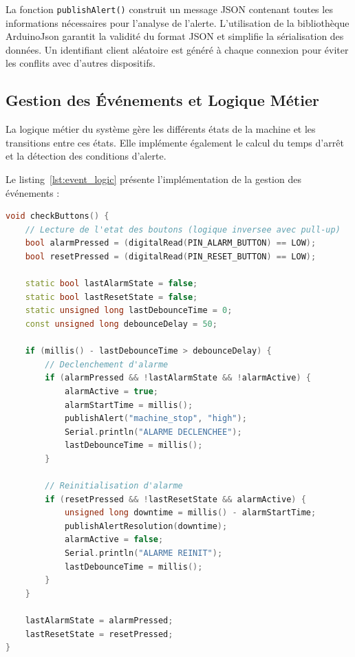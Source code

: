 La fonction \texttt{publishAlert()} construit un message JSON contenant toutes les informations nécessaires pour l'analyse de l'alerte. L'utilisation de la bibliothèque ArduinoJson garantit la validité du format JSON et simplifie la sérialisation des données. Un identifiant client aléatoire est généré à chaque connexion pour éviter les conflits avec d'autres dispositifs.

\subsection{Gestion des Événements et Logique Métier}
\label{subsec:impl_events}

La logique métier du système gère les différents états de la machine et les transitions entre ces états. Elle implémente également le calcul du temps d'arrêt et la détection des conditions d'alerte.

Le listing~\ref{lst:event_logic} présente l'implémentation de la gestion des événements :

\begin{lstlisting}[language=C++, caption={Logique de gestion des événements et états machine}, label={lst:event_logic}, captionpos=b]
void checkButtons() {
    // Lecture de l'etat des boutons (logique inversee avec pull-up)
    bool alarmPressed = (digitalRead(PIN_ALARM_BUTTON) == LOW);
    bool resetPressed = (digitalRead(PIN_RESET_BUTTON) == LOW);
    
    static bool lastAlarmState = false;
    static bool lastResetState = false;
    static unsigned long lastDebounceTime = 0;
    const unsigned long debounceDelay = 50;
    
    if (millis() - lastDebounceTime > debounceDelay) {
        // Declenchement d'alarme
        if (alarmPressed && !lastAlarmState && !alarmActive) {
            alarmActive = true;
            alarmStartTime = millis();
            publishAlert("machine_stop", "high");
            Serial.println("ALARME DECLENCHEE");
            lastDebounceTime = millis();
        }
        
        // Reinitialisation d'alarme
        if (resetPressed && !lastResetState && alarmActive) {
            unsigned long downtime = millis() - alarmStartTime;
            publishAlertResolution(downtime);
            alarmActive = false;
            Serial.println("ALARME REINIT");
            lastDebounceTime = millis();
        }
    }
    
    lastAlarmState = alarmPressed;
    lastResetState = resetPressed;
}
\end{lstlisting}

